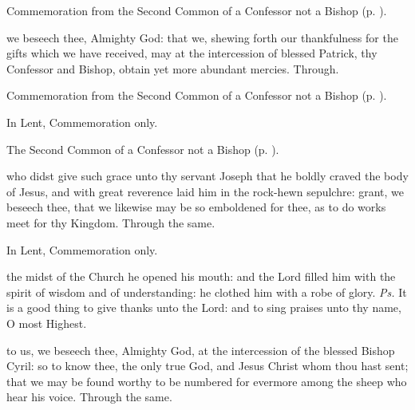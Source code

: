 \begin{rubric}
    Commemoration  from the Second Common of a Confessor not a Bishop (p. \pageref{CommonConfessorNotBishopII}). 
\end{rubric}

\postcommunion
{} we beseech thee, Almighty God: that we, shewing forth our thankfulness for the gifts which we have received, may at the intercession of blessed Patrick, thy Confessor and Bishop, obtain yet more abundant mercies. Through.

\begin{rubric}
    Commemoration  from the Second Common of a Confessor not a Bishop (p. \pageref{CommonConfessorNotBishopII}).
\end{rubric}


\clearpage
{}

\begin{rubric}
	In Lent, Commemoration only.
\end{rubric}

\begin{rubric}
	The Second Common of a Confessor not a Bishop (p. \pageref{CommonConfessorNotBishopII}).
\end{rubric}

\collect\label{ArimatheanCollect}
 who didst give such grace unto thy servant Joseph that he boldly craved the body of Jesus, and with great reverence laid him in the rock-hewn sepulchre: grant, we beseech thee, that we likewise may be so emboldened for thee, as to do works meet for thy Kingdom. Through the same.



\begin{rubric}
	In Lent, Commemoration only.
\end{rubric}

\introit
{} the midst of the Church he opened his mouth: and the Lord filled him with the spirit of wisdom and of understanding: he clothed him with a robe of glory. \textit{Ps.} It is a good thing to give thanks unto the Lord: and to sing praises unto thy name, O most Highest.

\collect\label{CyrilCollect}
 to us, we beseech thee, Almighty God, at the intercession of the blessed Bishop Cyril: so to know thee, the only true God, and Jesus Christ whom thou hast sent; that we may be found worthy to be numbered for evermore among the sheep who hear his voice. Through the same.

